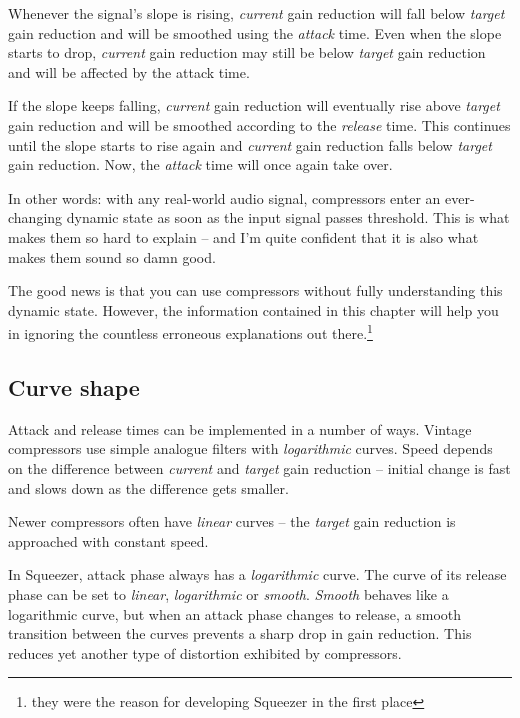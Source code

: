 Whenever the signal's slope is rising, \emph{current} gain reduction
will fall below \emph{target} gain reduction and will be smoothed
using the \emph{attack} time.  Even when the slope starts to drop,
\emph{current} gain reduction may still be below \emph{target} gain
reduction and will be affected by the attack time.

If the slope keeps falling, \emph{current} gain reduction will
eventually rise above \emph{target} gain reduction and will be
smoothed according to the \emph{release} time.  This continues until
the slope starts to rise again and \emph{current} gain reduction falls
below \emph{target} gain reduction.  Now, the \emph{attack} time will
once again take over.

In other words: with any real-world audio signal, compressors enter an
ever-changing dynamic state as soon as the input signal passes
threshold.  This is what makes them so hard to explain -- and I'm
quite confident that it is also what makes them sound so damn good.

The good news is that you can use compressors without fully
understanding this dynamic state.  However, the information contained
in this chapter will help you in ignoring the countless erroneous
explanations out there.\footnote{they were the reason for developing
  Squeezer in the first place}

\subsection{Curve shape}
\label{sec:curve_shape}

Attack and release times can be implemented in a number of ways.
Vintage compressors use simple analogue filters with
\emph{logarithmic} curves.  Speed depends on the difference between
\emph{current} and \emph{target} gain reduction -- initial change is
fast and slows down as the difference gets smaller.

Newer compressors often have \emph{linear} curves -- the \emph{target}
gain reduction is approached with constant speed.

In Squeezer, attack phase always has a \emph{logarithmic} curve.  The
curve of its release phase can be set to \emph{linear},
\emph{logarithmic} or \emph{smooth}.  \emph{Smooth} behaves like a
logarithmic curve, but when an attack phase changes to release, a
smooth transition between the curves prevents a sharp drop in gain
reduction.  This reduces yet another type of distortion exhibited by
compressors.

